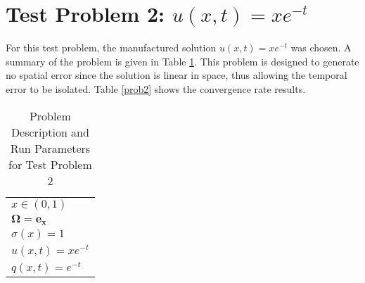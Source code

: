 \documentclass{report}
\begin{document}
\section{Test Problem 2: $u(x,t) = x e^{-t}$}

For this test problem, the manufactured solution $u(x,t) = x e^{-t}$
was chosen. A summary of the problem is given in Table \ref{prob2params}.
This problem is designed to generate no spatial error since
the solution is linear in space, thus allowing the temporal error
to be isolated. Table \ref{prob2} shows the convergence rate results.

\begin{table}[H]\caption{\label{prob2params}Problem Description and Run Parameters for Test Problem 2}
\begin{center}
\begin{tabular}{l}\hline\hline
$x\in(0,1)$ \\
$\mathbf{\Omega} = \mathbf{e_x}$ \\
$\sigma(x) = 1$ \\
$u(x,t) = x e^{-t}$ \\
$q(x,t) = e^{-t}$ \\\hline\hline
\end{tabular}
\end{center}
\end{table}
\end{document}
